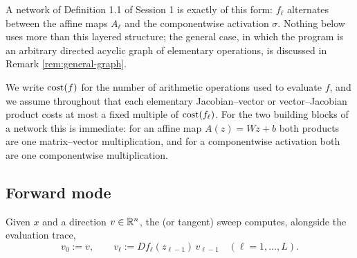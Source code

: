 \documentclass[11pt,a4paper]{article}
\begin{document}
A network of Definition 1.1 of Session 1 is exactly of this form: $f_\ell$ alternates between the
affine maps $A_\ell$ and the componentwise activation $\sigma$. Nothing below uses more than this
layered structure; the general case, in which the program is an arbitrary directed acyclic graph of
elementary operations, is discussed in Remark \ref{rem:general-graph}.

We write $\operatorname{cost}(f)$ for the number of arithmetic operations used to evaluate $f$, and we assume
throughout that each elementary Jacobian--vector or vector--Jacobian product costs at most a fixed
multiple of $\operatorname{cost}(f_\ell)$. For the two building blocks of a network this is immediate: for an
affine map $A(z) = Wz + b$ both products are one matrix--vector multiplication, and for a
componentwise activation both are one componentwise multiplication.

\begin{center}
\end{center}

\subsection{Forward mode}

\begin{definition}\label{def:forward}
Given $x$ and a direction $v \in \mathbb{R}^n$, the  (or tangent) sweep computes, alongside the
evaluation trace,
\[
v_0 := v, \qquad v_\ell := Df_\ell(z_{\ell-1})\, v_{\ell-1} \quad (\ell = 1,\dots,L).
\]
\end{definition}
\end{document}
